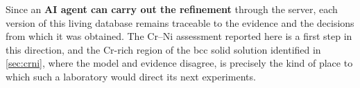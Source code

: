 Since an \textbf{AI agent can carry out the refinement} through the server, each version of this living database remains traceable to the evidence and the decisions from which it was obtained. The Cr--Ni assessment reported here is a first step in this direction, and the Cr-rich region of the bcc solid solution identified in \cref{sec:crni}, where the model and evidence disagree, is precisely the kind of place to which such a laboratory would direct its next experiments.

